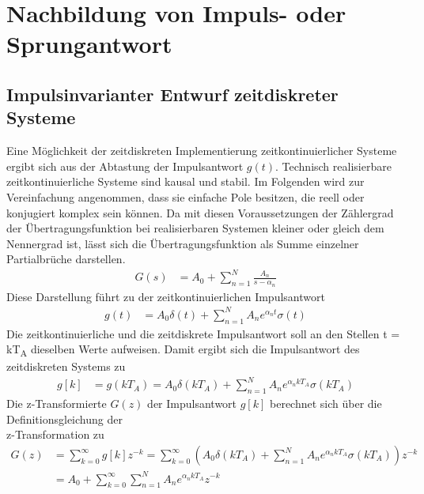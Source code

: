 \section{Nachbildung von Impuls- oder Sprungantwort}\label{sec:9.1}

\subsection{Impulsinvarianter Entwurf zeitdiskreter Systeme}\label{sec:impulsinvarianter-entwurf-zeitdiskreter-systeme}

Eine Möglichkeit der zeitdiskreten Implementierung zeitkontinuierlicher Systeme ergibt sich aus der Abtastung der Impulsantwort \(g(t)\). Technisch realisierbare zeitkontinuierliche Systeme sind kausal und stabil. Im Folgenden wird zur Vereinfachung angenommen, dass sie einfache Pole besitzen, die reell oder konjugiert komplex sein können. Da mit diesen Voraussetzungen der Zählergrad der Übertragungsfunktion bei realisierbaren Systemen kleiner oder gleich dem Nennergrad ist, lässt sich die Übertragungsfunktion als Summe einzelner Partialbrüche darstellen.
\begin{align}
G(s) &= A_{0} + \sum\limits_{n = 1}^{N}\frac{A_{n}}{s - \alpha_{n}} \label{eq:9.1}
\end{align}
Diese Darstellung führt zu der zeitkontinuierlichen Impulsantwort
\begin{align}
g(t) &= A_{0}  \delta(t) + \sum\limits_{n = 1}^{N}{A_{n}  e^{\alpha_{n}  t}  \sigma(t)} \label{eq:9.2}
\end{align}
Die zeitkontinuierliche und die zeitdiskrete Impulsantwort soll an den Stellen t = kT\textsubscript{A} dieselben Werte aufweisen. Damit ergibt sich die Impulsantwort des zeitdiskreten Systems zu
\begin{align}
g[ k] &= g\left( k  T_{A} \right) = A_{0}  \delta\left( k  T_{A} \right) + \sum\limits_{n = 1}^{N}{A_{n}  e^{\alpha_{n}  k  T_{A}}  \sigma\left( k  T_{A} \right)} \label{eq:9.3}
\end{align}
Die z-Transformierte \(G(z)\) der Impulsantwort \(g[k]\) berechnet sich über die Definitionsgleichung der\\
z-Transformation zu
\begin{align}
{G\left(z\right)} &=  {\sum\limits _{k=0}^{\infty }g\left[k\right] z^{-k}  =\sum\limits _{k=0}^{\infty }\left(A_{0}  \delta \left(k T_{A} \right)+\sum\limits _{n=1}^{N}A_{n}  e^{\alpha _{n}  k T_{A} }  \sigma \left(k T_{A} \right) \right) z^{-k}  } \\
{} &=  {A_{0} +\sum\limits _{k=0}^{\infty }\sum\limits _{n=1}^{N}A_{n}  e^{\alpha _{n}  k T_{A} }   z^{-k}  }
\label{eq:9.4}
\end{align}
